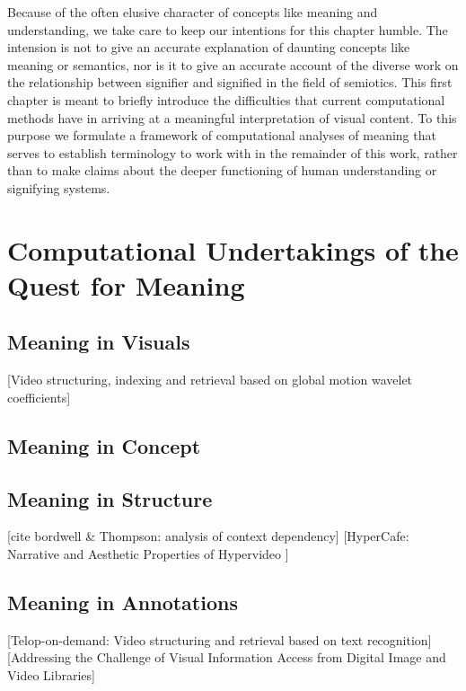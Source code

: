 Because of the often elusive character of concepts like meaning and understanding, we take care to keep our intentions for this chapter humble. The intension is not to give an accurate explanation of daunting concepts like meaning or semantics, nor is it to give an accurate account of the diverse work on the relationship between signifier and signified in the field of semiotics. This first chapter is meant to briefly introduce the difficulties that current computational methods have in arriving at a meaningful interpretation of visual content. To this purpose we formulate a framework of computational analyses of meaning that serves to establish terminology to work with in the remainder of this work, rather than to make claims about the deeper functioning of human understanding or signifying systems.




\section{Computational Undertakings of the Quest for Meaning}

\subsection{Meaning in Visuals}
[Video structuring, indexing and retrieval based on global motion wavelet coefficients]\cite{Bruno:2002tt}

\subsection{Meaning in Concept}
\subsection{Meaning in Structure}
[cite bordwell \& Thompson: analysis of context dependency]
[HyperCafe: Narrative and Aesthetic Properties of Hypervideo \cite{Sawhney:1996tk}]

\subsection{Meaning in Annotations}
[Telop-on-demand: Video structuring and retrieval based on text recognition]\cite{Kuwano:2000wy}
[Addressing the Challenge of Visual Information Access from Digital Image and Video Libraries]\cite{Christel:2005td}


